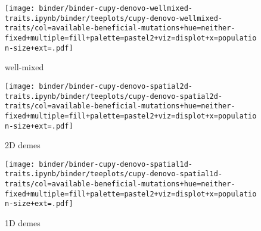 \begin{sidewaysfigure}[h]
  \rotatesidewayslabel
\begin{subfigure}[b]{0.36\linewidth}
    \begin{minipage}{\linewidth}
      \texttt{[image: binder/binder-cupy-denovo-wellmixed-traits.ipynb/binder/teeplots/cupy-denovo-wellmixed-traits/col=available-beneficial-mutations+hue=neither-fixed+multiple=fill+palette=pastel2+viz=displot+x=population-size+ext=.pdf]}%
    \end{minipage}
    \begin{minipage}{\linewidth}
    \caption{well-mixed}
    \label{fig:neither-fixed-denovo-cupy:wellmixed}
    \end{minipage}%
\end{subfigure}%
\begin{subfigure}[b]{0.32\linewidth}
    \begin{minipage}{\linewidth}
      \texttt{[image: binder/binder-cupy-denovo-spatial2d-traits.ipynb/binder/teeplots/cupy-denovo-spatial2d-traits/col=available-beneficial-mutations+hue=neither-fixed+multiple=fill+palette=pastel2+viz=displot+x=population-size+ext=.pdf]}%
    \end{minipage}
    \begin{minipage}{\linewidth}
    \caption{2D demes}
    \label{fig:neither-fixed-denovo-cupy:spatial2d}
    \end{minipage}%
\end{subfigure}%
\begin{subfigure}[b]{0.32\linewidth}
    \begin{minipage}{\linewidth}
      \texttt{[image: binder/binder-cupy-denovo-spatial1d-traits.ipynb/binder/teeplots/cupy-denovo-spatial1d-traits/col=available-beneficial-mutations+hue=neither-fixed+multiple=fill+palette=pastel2+viz=displot+x=population-size+ext=.pdf]}%
    \end{minipage}
    \begin{minipage}{\linewidth}
    \caption{1D demes}
    \label{fig:neither-fixed-denovo-cupy:spatial1d}
    \end{minipage}%
\end{subfigure}%


\end{sidewaysfigure}
